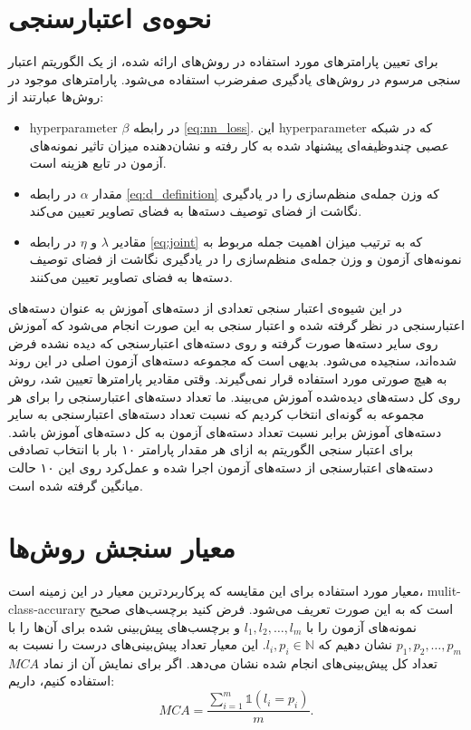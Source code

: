 \section{نحوه‌ی اعتبارسنجی}\label{exp:validation}
برای تعیین پارامترهای مورد استفاده در روش‌های ارائه شده،  از یک الگوریتم اعتبار سنجی مرسوم در روش‌های یادگیری صفرضرب استفاده می‌شود.
پارامترهای موجود در روش‌ها عبارتند از:
\begin{itemize}
\item
 \gls{hyperparameter} $\beta$ در رابطه \eqref{eq:nn_loss}. این \gls{hyperparameter} که در شبکه عصبی چندوظیفه‌ای پیشنهاد شده به کار رفته و نشان‌دهنده میزان تاثیر نمونه‌های آزمون در تابع هزینه است.
\item
مقدار $\alpha$ در رابطه \eqref{eq:d_definition} که وزن جمله‌ی منظم‌سازی را در یادگیری نگاشت از فضای توصیف دسته‌ها به فضای تصاویر تعیین می‌کند.
\item
مقادیر  $\lambda$ و $\eta$ در رابطه \eqref{eq:joint} که به ترتیب میزان اهمیت جمله مربوط به نمونه‌های آزمون و وزن جمله‌ی منظم‌سازی را در یادگیری نگاشت از فضای توصیف دسته‌ها به فضای تصاویر  تعیین می‌کنند.
\end{itemize}
در این شیوه‌ی اعتبار سنجی تعدادی از دسته‌های آموزش به عنوان دسته‌های اعتبارسنجی در نظر گرفته شده و اعتبار سنجی به این صورت انجام می‌شود که آموزش روی سایر دسته‌ها صورت گرفته و روی دسته‌های اعتبارسنجی که دیده نشده فرض شده‌اند، سنجیده می‌شود. بدیهی است که مجموعه‌ دسته‌های آزمون اصلی در این روند به هیچ صورتی مورد استفاده قرار نمی‌گیرند. وقتی مقادیر پارامترها تعیین شد، روش روی کل دسته‌های دیده‌شده آموزش می‌بیند. ما تعداد دسته‌های اعتبارسنجی را برای هر مجموعه به گونه‌ای انتخاب کردیم که نسبت تعداد دسته‌های اعتبارسنجی به سایر دسته‌های آموزش برابر نسبت تعداد دسته‌های آزمون به کل دسته‌های آموزش باشد. برای اعتبار سنجی الگوریتم به ازای هر مقدار پارامتر ۱۰ بار با انتخاب تصادفی دسته‌های اعتبارسنجی از دسته‌های آزمون اجرا شده و عمل‌کرد روی این ۱۰ حالت میانگین گرفته شده است.
%
\section{معیار سنجش روش‌ها}\label{criteria}
 معیار مورد استفاده برای این مقایسه که پرکاربردترین معیار در این زمینه است، \gls{mulit-class-accurary} است که به این صورت تعریف می‌شود. فرض کنید برچسب‌های صحیح نمونه‌های آزمون را با
$l_1, l_2, \ldots, l_m$
و  برچسب‌های پیش‌بینی شده برای آن‌ها را با
$p_1, p_2, \ldots, p_m$
نشان دهیم که
$l_i, p_i \in \mathbb{N}$.
این معیار تعداد پیش‌بینی‌های درست را نسبت به تعداد کل پیش‌بینی‌های انجام شده نشان می‌دهد. اگر برای نمایش آن از نماد $MCA$ استفاده کنیم، داریم:
\begin{equation}
MCA = \frac{\sum_{i=1}^m \mathds{1}(l_i = p_i)}{m}.
\end{equation}
